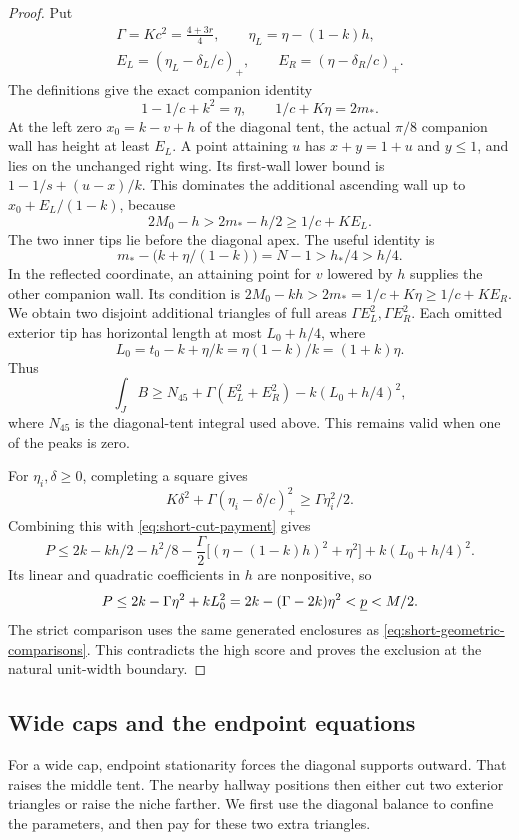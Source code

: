 \begin{proof}
Put
\[
 \begin{gathered}
 \Gamma=Kc^2=\frac{4+3r}{4},\qquad \eta_L=\eta-(1-k)h,\\
 E_L=(\eta_L-\delta_L/c)_+,\qquad E_R=(\eta-\delta_R/c)_+.
 \end{gathered}
\]
The definitions give the exact companion identity
\[
 1-1/c+k^2=\eta,\qquad 1/c+K\eta=2m_*.
\]
At the left zero $x_0=k-v+h$ of the diagonal tent, the actual
$\pi/8$ companion wall has height at least $E_L$.
A point attaining $u$ has $x+y=1+u$ and $y\le1$, and lies on
the unchanged right wing. Its first-wall lower bound is
$1-1/s+(u-x)/k$. This dominates the additional ascending wall
up to $x_0+E_L/(1-k)$, because
\[
 2M_0-h>2m_*-h/2\ge1/c+KE_L.
\]
The two inner tips lie before the diagonal apex. The useful identity is
\[
 m_*-\bigl(k+\eta/(1-k)\bigr)=N-1>h_*/4>h/4.
\]
In the reflected coordinate, an attaining point for $v$ lowered by $h$
supplies the other companion wall. Its condition is
$2M_0-kh>2m_*=1/c+K\eta\ge1/c+KE_R$.
We obtain two disjoint additional triangles of full areas
$\Gamma E_L^2,\Gamma E_R^2$. Each omitted exterior tip has horizontal
length at most $L_0+h/4$, where
\[
 L_0=t_0-k+\eta/k=\eta(1-k)/k=(1+k)\eta.
\]
Thus
\[
 \int_J B\ge N_{45}+\Gamma(E_L^2+E_R^2)-k(L_0+h/4)^2,
\]
where $N_{45}$ is the diagonal-tent integral used above.
This remains valid when one of the peaks is zero.

For $\eta_i,\delta\ge0$, completing a square gives
\[
 K\delta^2+\Gamma(\eta_i-\delta/c)_+^2\ge\Gamma\eta_i^2/2.
\]
Combining this with \cref{eq:short-cut-payment} gives
\[
 P\le2k-kh/2-h^2/8
       -\frac\Gamma2\bigl[(\eta-(1-k)h)^2+\eta^2\bigr]
       +k(L_0+h/4)^2.
\]
Its linear and quadratic coefficients in $h$ are nonpositive, so
\[
 P\le2k-\Gamma\eta^2+kL_0^2
   =2k-(\Gamma-2k)\eta^2<\underline p<M/2.
\]
The strict comparison uses the same generated enclosures as
\cref{eq:short-geometric-comparisons}. This contradicts the high score
and proves the exclusion at the natural unit-width boundary.
\end{proof}

\subsection{Wide caps and the endpoint equations}

For a wide cap, endpoint stationarity forces the diagonal supports
outward. That raises the middle tent. The nearby hallway positions
then either cut two exterior triangles or raise the niche farther.
We first use the diagonal balance to confine the parameters, and
then pay for these two extra triangles.

